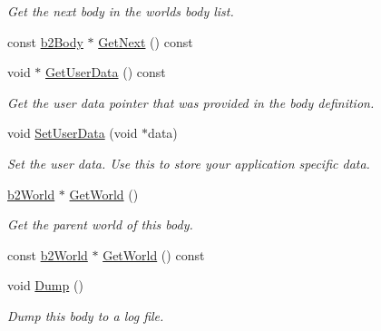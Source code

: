 \begin{DoxyCompactItemize}
\begin{DoxyCompactList}\small\item\em Get the next body in the world\textquotesingle{}s body list. \end{DoxyCompactList}\item 
const \mbox{\hyperlink{classb2_body}{b2\+Body}} $\ast$ \mbox{\hyperlink{classb2_body_aa118d06e0ae6444c02bb5d22bb448269}{Get\+Next}} () const
\item 
void $\ast$ \mbox{\hyperlink{classb2_body_a672c782f7184faf3d673b08681dd63e3}{Get\+User\+Data}} () const
\begin{DoxyCompactList}\small\item\em Get the user data pointer that was provided in the body definition. \end{DoxyCompactList}\item 
void \mbox{\hyperlink{classb2_body_a5553a5ecdfd2d7200ba2405ce6043f52}{Set\+User\+Data}} (void $\ast$data)
\begin{DoxyCompactList}\small\item\em Set the user data. Use this to store your application specific data. \end{DoxyCompactList}\item 
\mbox{\hyperlink{classb2_world}{b2\+World}} $\ast$ \mbox{\hyperlink{classb2_body_abfd9466763b20977f9122d0e162dfeb9}{Get\+World}} ()
\begin{DoxyCompactList}\small\item\em Get the parent world of this body. \end{DoxyCompactList}\item 
const \mbox{\hyperlink{classb2_world}{b2\+World}} $\ast$ \mbox{\hyperlink{classb2_body_a7e0fc2b91fbfc11da467700fd0792088}{Get\+World}} () const
\item 
void \mbox{\hyperlink{classb2_body_ac9e482f7d9df92801c24e79a7e751d06}{Dump}} ()
\begin{DoxyCompactList}\small\item\em Dump this body to a log file. \end{DoxyCompactList}\end{DoxyCompactItemize}
